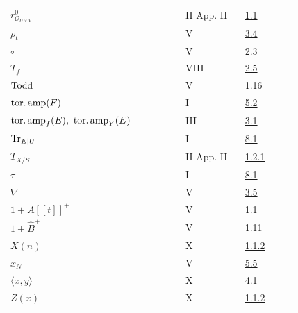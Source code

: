 \begin{longtable}{@{}>{\raggedright\arraybackslash}p{0.50\linewidth}>{\raggedright\arraybackslash}p{0.17\linewidth}>{\raggedright\arraybackslash}p{0.15\linewidth}@{}}
\(r^0_{\mathcal O_{U\times V}}\) & II App. II & \hyperlink{sga6.e02.sec.1.1}{1.1}\\
\(\rho_t\) & V & \hyperlink{sga6.e05.para.3-4}{3.4}\\
\(\circ\) & V & \hyperlink{sga6.e05.para.2-3}{2.3}\\
\(T_f\) & VIII & \hyperlink{sga6.e08.cor.2-5}{2.5}\\
\(\operatorname{Todd}\) & V & \hyperlink{sga6.e05.para.1-16}{1.16}\\
\(\operatorname{tor.amp}(F)\) & I & \hyperlink{sga6.e01.def.5-2}{5.2}\\
\(\toramp_f(E),\ \toramp_Y(E)\) & III & \hyperlink{sga6.e03.def.3-1}{3.1}\\
\(\operatorname{Tr}_{E|U}\) & I & \hyperlink{sga6.e01.para.8-1}{8.1}\\
\(T_{X/S}\) & II App. II & \hyperlink{sga6.e02.para.1-2-1}{1.2.1}\\
\(\tau\) & I & \hyperlink{sga6.e01.para.8-1}{8.1}\\
\(\nabla\) & V & \hyperlink{sga6.e05.para.3-5}{3.5}\\
\(1+A[[t]]^+\) & V & \hyperlink{sga6.e05.para.1-1}{1.1}\\
\(1+\widehat B^+\) & V & \hyperlink{sga6.e05.para.1-11}{1.11}\\
\(X(n)\) & X & \hyperlink{sga6.e10.prop.1-1-2}{1.1.2}\\
\(x_N\) & V & \hyperlink{sga6.e05.para.5-5}{5.5}\\
\(\langle x,y\rangle\) & X & \hyperlink{sga6.e10.sec.4.1}{4.1}\\
\(Z(x)\) & X & \hyperlink{sga6.e10.prop.1-1-2}{1.1.2}\\
\bottomrule
\end{longtable}
\endgroup
